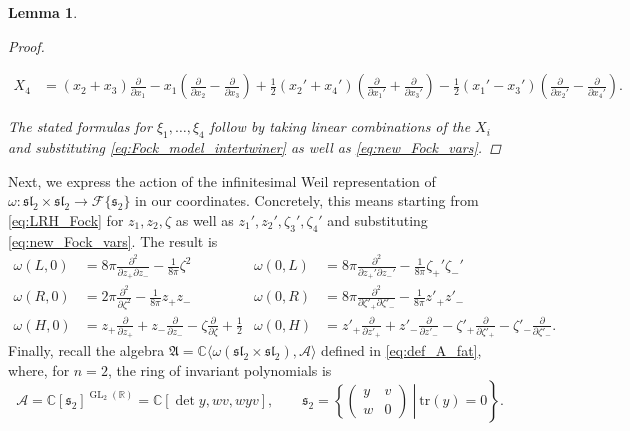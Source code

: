 \documentclass[reqno, 11pt]{amsart} %
\numberwithin{equation}{section}
\theoremstyle{plain}
\newtheorem{lemma}[theorem]{Lemma}
\theoremstyle{definition}
\theoremstyle{remark}
\newcommand{\tr}{\mathrm{tr}}
\newcommand{\mbC}{\mathbb{C}}
\newcommand{\mcA}{\mathcal{A}}
\newcommand{\bbC}{\mathbb C}
\newcommand{\bbR}{\mathbb R}
\newcommand{\calF}{\mathcal F}
\newcommand{\lie}[1]{ \mathfrak{#1}}
\DeclareMathOperator{\GL}{GL}
\begin{document}
\begin{lemma}
\begin{proof}
\begin{small}
\begin{align*}
X_4 &= (x_2 + x_3) \frac{\partial}{\partial x_1} - x_1 \left(\frac{\partial}{\partial x_2} - \frac{\partial}{\partial x_3} \right)  + \frac12 \left( x_2' + x_4' \right) \left( \frac{\partial}{\partial x_1'} + \frac{\partial}{\partial x_3'} \right) - \frac12(x_1' - x_3') \left(\frac{\partial}{\partial x_2'} - \frac{\partial}{\partial x_4'} \right).
\end{align*}
\end{small}
The stated formulas for $ξ_1,\ldots,ξ_4$ follow by taking linear combinations of the $X_i$ and substituting \eqref{eq:Fock_model_intertwiner} as well as \eqref{eq:new_Fock_vars}.
\end{proof}
\end{lemma}

Next, we express the action of the infinitesimal Weil representation of $\omega\colon \lie{sl_2} \times \lie{sl}_2 \to \calF\{ \lie s_2\}$ in our coordinates. Concretely, this means starting from \eqref{eq:LRH_Fock} for $z_1, z_2, ζ$ as well as $z_1', z_2', ζ_3', ζ_4'$ and substituting \eqref{eq:new_Fock_vars}. The result is
\begin{equation}\label{eq:Weil_rep_S2}
\begin{aligned}
\omega(L,0) &= 8 \pi \frac{\partial^2}{\partial z_+ \partial z_-} - \frac{1}{8 \pi} \zeta^2 & \omega(0,L)&= 8 \pi \frac{\partial^2}{\partial z_+' \partial z_-'} - \frac1{8\pi} \zeta_+'\zeta_-' \\
\omega(R,0) &=  2 \pi \frac{\partial^2}{\partial \zeta^2} - \frac1{8 \pi} z_+ z_- & \omega(0,R) &=  8 \pi \frac{\partial^2}{\partial \zeta'_+ \partial \zeta'_-}  - \frac{1}{8 \pi} z'_+ z'_- \\
\omega(H,0) &= z_+ \frac{\partial}{ \partial z_+} + z_- \frac{\partial}{\partial z_-} - \zeta \frac{\partial}{\partial \zeta} + \frac12
& \omega(0,H) &=  z'_+ \frac{\partial}{ \partial z'_+} + z'_- \frac{\partial}{\partial z'_-} - \zeta'_+ \frac{\partial}{\partial \zeta'_+}   - \zeta'_- \frac{\partial}{\partial \zeta'_-} .
\end{aligned}
\end{equation}
Finally, recall the algebra $ \lie{A} = \mbC\langle ω(\lie{sl}_2 \times \lie{sl}_2), \mcA\rangle$ defined in \eqref{eq:def_A_fat}, where, for $n=2$, the ring of invariant polynomials is
\[
\mathcal A = \bbC[\lie s_2]^{\GL_2(\bbR)} = \bbC[ \det y, wv, wyv ], \qquad  \lie{s}_2 = \left.\left\{  \begin{pmatrix} y & v \\ w & 0 \end{pmatrix} \ \right\vert \ \tr(y) = 0  \right\}.
\]
\end{document}
